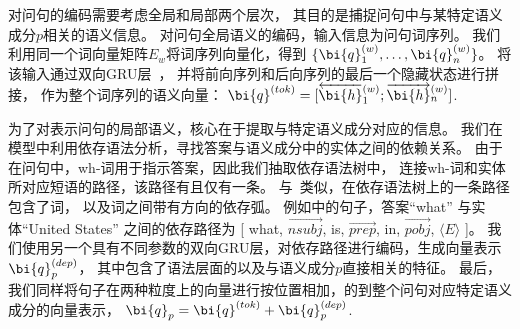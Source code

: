 对问句的编码需要考虑全局和局部两个层次，
其目的是捕捉问句中与某特定语义成分$p$相关的语义信息。
对问句全局语义的编码，输入信息为问句词序列。
我们利用同一个词向量矩阵$E_w$将词序列向量化，得到
$\{\bi{q}_1^{(w)}, \dots, \bi{q}_n^{(w)}\}$。
将该输入通过双向GRU层~\cite{cho2014properties}，
并将前向序列和后向序列的最后一个隐藏状态进行拼接，
作为整个词序列的语义向量：
$\bi{q}^{(tok)} = [\overleftarrow{\bi{h}}_1^{(w)};\overrightarrow{\bi{h}}_n^{(w)}]$.




为了对表示问句的局部语义，核心在于提取与特定语义成分对应的信息。%
我们在模型中利用依存语法分析，寻找答案与语义成分中的实体之间的依赖关系。
由于在问句中，wh-词用于指示答案，因此我们抽取依存语法树中，
连接wh-词和实体所对应短语的路径，该路径有且仅有一条。
与~\cite{xu2016question}类似，在依存语法树上的一条路径包含了词，
以及词之间带有方向的依存弧。
例如中的句子，答案``what'' 与实体``United States'' 之间的依存路径为
[ what, $\overrightarrow{nsubj}$, is, $\overrightarrow{prep}$, in, $\overrightarrow{pobj}$, $\langle E \rangle$ ]。
我们使用另一个具有不同参数的双向GRU层，对依存路径进行编码，生成向量表示$\bi{q}_p^{(dep)}$，
其中包含了语法层面的以及与语义成分$p$直接相关的特征。
最后，我们同样将句子在两种粒度上的向量进行按位置相加，的到整个问句对应特定语义成分的向量表示，
$\bi{q}_p = \bi{q}^{(tok)} + \bi{q}_p^{(dep)}$.


